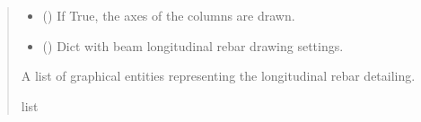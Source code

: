 \documentclass[a4paper,10pt,english]{sphinxmanual}
\begin{document}
\begin{fulllineitems}
\begin{fulllineitems}
\begin{quote}
\begin{description}
\begin{itemize}
\item {} 
\sphinxAtStartPar
{} () \textendash{} If True, the axes of the columns are drawn.

\item {} 
\sphinxAtStartPar
{} () \textendash{} Dict with beam longitudinal rebar drawing settings.

\end{itemize}

\sphinxAtStartPar
A list of graphical entities representing the longitudinal rebar detailing.

\sphinxAtStartPar
list

\end{description}\end{quote}

\end{fulllineitems}



\end{fulllineitems}
\end{document}
